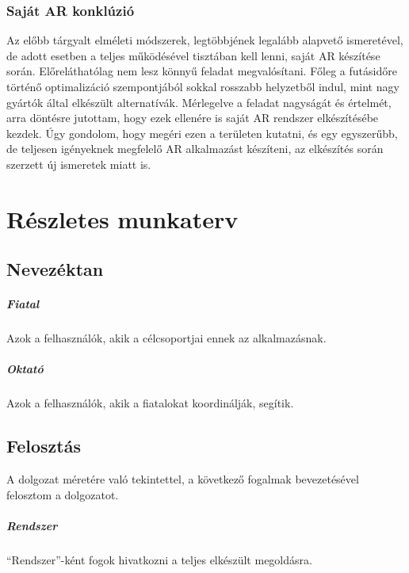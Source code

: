 \documentclass[12pt,a4paper,oneside]{report} %
\begin{document}
\subsection{Saját AR konklúzió}
Az előbb tárgyalt elméleti módszerek, legtöbbjének legalább alapvető ismeretével, de adott esetben a teljes  működésével tisztában kell lenni, saját AR készítése során. Előreláthatólag nem lesz könnyű feladat megvalósítani. Főleg a futásidőre történő optimalizáció szempontjából sokkal rosszabb helyzetből indul, mint nagy gyártók által elkészült alternatívák. Mérlegelve a feladat nagyságát és értelmét, arra döntésre jutottam, hogy ezek ellenére is saját AR rendszer elkészítésébe kezdek. Úgy gondolom, hogy megéri ezen a területen kutatni, és egy egyszerűbb, de teljesen igényeknek megfelelő AR alkalmazást készíteni, az elkészítés során szerzett új ismeretek miatt is.

\chapter{Részletes munkaterv}
\label{munakterv}
\section{Nevezéktan}
\paragraph{Fiatal} Azok a felhasználók, akik a célcsoportjai ennek az alkalmazásnak.
\paragraph{Oktató} Azok a felhasználók, akik a fiatalokat koordinálják, segítik.

\section{Felosztás}
A dolgozat méretére való tekintettel, a következő fogalmak bevezetésével felosztom a dolgozatot.
\paragraph{Rendszer}
``Rendszer''-ként fogok hivatkozni a teljes elkészült megoldásra.
\end{document}
